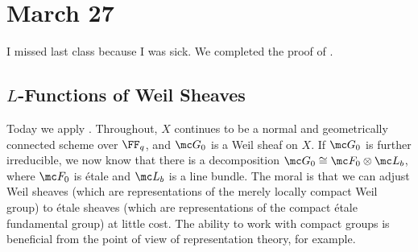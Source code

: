 \documentclass[../notes.tex]{subfiles}
\begin{document}
\section{March 27}
I missed last class because I was sick. We completed the proof of .

\subsection{\texorpdfstring{$L$}{ L}-Functions of Weil Sheaves}
Today we apply . Throughout, $X$ continues to be a normal and geometrically connected scheme over $\FF_q$, and $\mc G_0$ is a Weil sheaf on $X$. If $\mc G_0$ is further irreducible, we now know that there is a decomposition $\mc G_0\cong\mc F_0\otimes\mc L_b$, where $\mc F_0$ is \'etale and $\mc L_b$ is a line bundle. The moral is that we can adjust Weil sheaves (which are representations of the merely locally compact Weil group) to \'etale sheaves (which are representations of the compact \'etale fundamental group) at little cost. The ability to work with compact groups is beneficial from the point of view of representation theory, for example.
\end{document}
